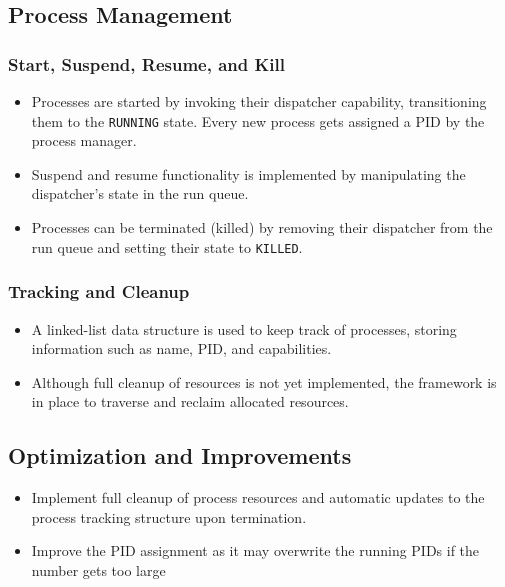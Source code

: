 \subsection*{Process Management}
\subsubsection*{Start, Suspend, Resume, and Kill}
\begin{itemize}
    \item Processes are started by invoking their dispatcher capability, transitioning them to the \texttt{RUNNING} state. Every new process gets assigned a PID by the process manager.
    \item Suspend and resume functionality is implemented by manipulating the dispatcher’s state in the run queue.
    \item Processes can be terminated (killed) by removing their dispatcher from the run queue and setting their state to \texttt{KILLED}.
\end{itemize}


\subsubsection*{Tracking and Cleanup}
\begin{itemize}
    \item A linked-list data structure is used to keep track of processes, storing information such as name, PID, and capabilities.
    \item Although full cleanup of resources is not yet implemented, the framework is in place to traverse and reclaim allocated resources.
\end{itemize}

\subsection*{Optimization and Improvements}
\begin{itemize}
    \item Implement full cleanup of process resources and automatic updates to the process tracking structure upon termination.
    \item Improve the PID assignment as it may overwrite the running PIDs if the number gets too large
\end{itemize}
